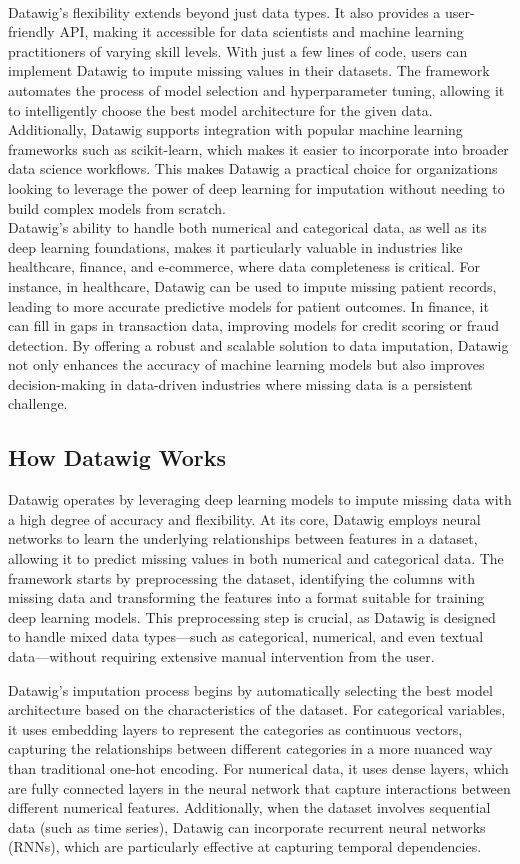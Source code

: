 \documentclass{article}
\begin{document}
\\
Datawig’s flexibility extends beyond just data types. It also provides a user-friendly API, making it accessible for data scientists and machine learning practitioners of varying skill levels. With just a few lines of code, users can implement Datawig to impute missing values in their datasets. The framework automates the process of model selection and hyperparameter tuning, allowing it to intelligently choose the best model architecture for the given data. Additionally, Datawig supports integration with popular machine learning frameworks such as scikit-learn, which makes it easier to incorporate into broader data science workflows. This makes Datawig a practical choice for organizations looking to leverage the power of deep learning for imputation without needing to build complex models from scratch.
\\
Datawig’s ability to handle both numerical and categorical data, as well as its deep learning foundations, makes it particularly valuable in industries like healthcare, finance, and e-commerce, where data completeness is critical. For instance, in healthcare, Datawig can be used to impute missing patient records, leading to more accurate predictive models for patient outcomes. In finance, it can fill in gaps in transaction data, improving models for credit scoring or fraud detection. By offering a robust and scalable solution to data imputation, Datawig not only enhances the accuracy of machine learning models but also improves decision-making in data-driven industries where missing data is a persistent challenge.

\subsection{How Datawig Works}
Datawig operates by leveraging deep learning models to impute missing data with a high degree of accuracy and flexibility. At its core, Datawig employs neural networks to learn the underlying relationships between features in a dataset, allowing it to predict missing values in both numerical and categorical data. The framework starts by preprocessing the dataset, identifying the columns with missing data and transforming the features into a format suitable for training deep learning models. This preprocessing step is crucial, as Datawig is designed to handle mixed data types—such as categorical, numerical, and even textual data—without requiring extensive manual intervention from the user.

Datawig’s imputation process begins by automatically selecting the best model architecture based on the characteristics of the dataset. For categorical variables, it uses embedding layers to represent the categories as continuous vectors, capturing the relationships between different categories in a more nuanced way than traditional one-hot encoding. For numerical data, it uses dense layers, which are fully connected layers in the neural network that capture interactions between different numerical features. Additionally, when the dataset involves sequential data (such as time series), Datawig can incorporate recurrent neural networks (RNNs), which are particularly effective at capturing temporal dependencies.
\end{document}
